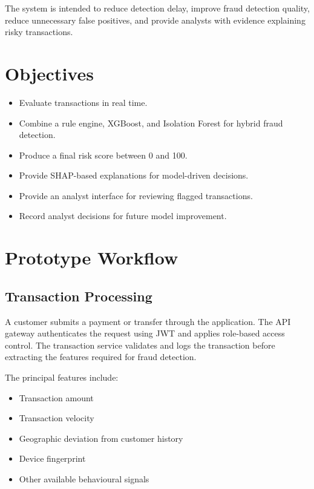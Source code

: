 \documentclass[11pt,a4paper]{article}
\begin{document}
The system is intended to reduce detection delay, improve fraud detection quality, reduce
unnecessary false positives, and provide analysts with evidence explaining risky transactions.

\section{Objectives}

\begin{itemize}[leftmargin=1.4em,itemsep=2pt]
\item Evaluate transactions in real time.
\item Combine a rule engine, XGBoost, and Isolation Forest for hybrid fraud detection.
\item Produce a final risk score between 0 and 100.
\item Provide SHAP-based explanations for model-driven decisions.
\item Provide an analyst interface for reviewing flagged transactions.
\item Record analyst decisions for future model improvement.
\end{itemize}

\section{Prototype Workflow}

\subsection{Transaction Processing}

A customer submits a payment or transfer through the application. The API gateway authenticates
the request using JWT and applies role-based access control. The transaction service validates
and logs the transaction before extracting the features required for fraud detection.

The principal features include:

\begin{itemize}[leftmargin=1.4em,itemsep=2pt]
\item Transaction amount
\item Transaction velocity
\item Geographic deviation from customer history
\item Device fingerprint
\item Other available behavioural signals
\end{itemize}
\end{document}
